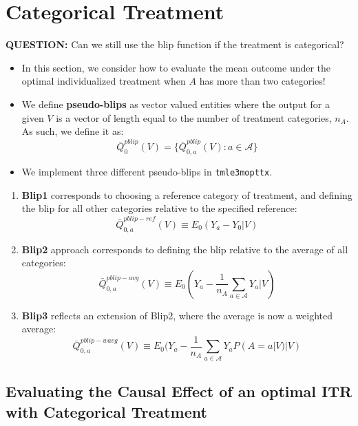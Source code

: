\documentclass[
  12pt, krantz2,
]{book}
\newcommand{\passthrough}[1]{#1}
\theoremstyle{definition}
\theoremstyle{definition}
\theoremstyle{definition}
\newcommand{\1}{\mathbbm{1}}
\begin{document}
\hypertarget{categorical-treatment}{%
\section{Categorical Treatment}\label{categorical-treatment}}

\textbf{QUESTION:} Can we still use the blip function if the treatment is
categorical?

\begin{itemize}
\item
  In this section, we consider how to evaluate the mean outcome under the
  optimal individualized treatment when \(A\) has more than two categories!
\item
  We define \textbf{pseudo-blips} as vector valued entities where the output for a
  given \(V\) is a vector of length equal to the number of treatment categories,
  \(n_A\). As such, we define it as: \[\bar{Q}_0^{pblip}(V) =
  \{\bar{Q}_{0,a}^{pblip}(V): a \in \mathcal{A} \}\]
\item
  We implement three different pseudo-blips in \passthrough{\lstinline!tmle3mopttx!}.
\end{itemize}

\begin{enumerate}
\def\labelenumi{\arabic{enumi}.}
\item
  \textbf{Blip1} corresponds to choosing a reference category of treatment, and
  defining the blip for all other categories relative to the specified
  reference: \[\bar{Q}_{0,a}^{pblip-ref}(V) \equiv E_0(Y_a-Y_0|V)\]
\item
  \textbf{Blip2} approach corresponds to defining the blip relative to the average
  of all categories:
  \[\bar{Q}_{0,a}^{pblip-avg}(V) \equiv E_0(Y_a- \frac{1}{n_A} \sum_{a \in \mathcal{A}} Y_a|V)\]
\item
  \textbf{Blip3} reflects an extension of Blip2, where the average is now a weighted
  average:
  \[\bar{Q}_{0,a}^{pblip-wavg}(V) \equiv E_0(Y_a- \frac{1}{n_A}
  \sum_{a \in \mathcal{A}} Y_{a} P(A=a|V)|V)\]
\end{enumerate}

\hypertarget{evaluating-the-causal-effect-of-an-optimal-itr-with-categorical-treatment}{%
\subsection{Evaluating the Causal Effect of an optimal ITR with Categorical Treatment}\label{evaluating-the-causal-effect-of-an-optimal-itr-with-categorical-treatment}}
\end{document}
